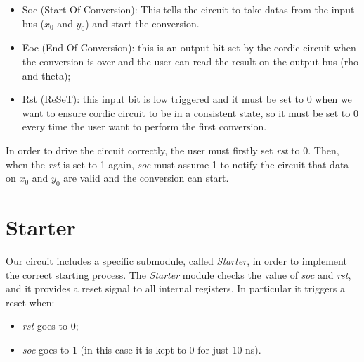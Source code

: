\documentclass[12pt,a4paper]{report}
\begin{document}
\begin{itemize}
	\item Soc (Start Of Conversion): This tells the circuit to take datas from the input bus ($x_{0}$ and $y_0$) and start the conversion.
	\item Eoc (End Of Conversion): this is an output bit set by the cordic circuit when the conversion is over and the user can read the result on the output bus (rho and theta);
	\item Rst (ReSeT): this input bit is low triggered and it must be set to 0 when we want to ensure cordic circuit to be in a consistent state, so it must be set to 0 every time the user want to perform the first conversion.
\end{itemize}

In order to drive the circuit correctly, the user must firstly set \emph{rst} to 0. Then, when the \emph{rst} is set to 1 again, \emph{soc} must assume 1 to notify the circuit that data on $x_0$ and $y_0$ are valid and the conversion can start.

\section{Starter}
Our circuit includes a specific submodule, called \emph{Starter}, in order to implement the correct starting process. The \emph{Starter} module checks the value of \emph{soc} and \emph{rst}, and it provides a reset signal to all internal registers. In particular it triggers a reset when:

\begin{itemize}
	\item \emph{rst} goes to 0;
	\item \emph{soc} goes to 1 (in this case it is kept to 0 for just 10 ns).
\end{itemize}
\end{document}
